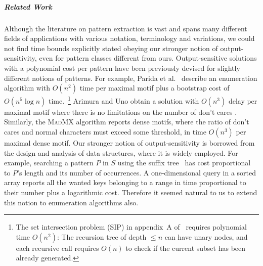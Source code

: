 \subparagraph{Related Work} Although the literature on pattern extraction is vast and spans many different fields of applications with various notation, terminology and variations, we could not find time bounds explicitly stated obeying our stronger notion of output-sensitivity, even for pattern classes different from ours. Output-sensitive solutions with a polynomial cost per pattern have been previously devised for slightly different notions of patterns. For example, Parida et al.~\cite{P+01} describe an enumeration algorithm with $O(n^2)$ time per maximal motif plus a bootstrap cost of $O(n^5 \log n)$ time.~\footnote{The set intersection   problem (SIP) in appendix~A of~\cite{P+01} requires polynomial time   $O(n^2)$: The recursion tree of depth $\leq n$ can have unary nodes,   and each recursive call requires $O(n)$ to check if the current   subset has been already generated.}  Arimura and Uno obtain a solution with $O(n^3)$ delay per maximal motif where there is no limitations on the number of don't cares \cite{arimura2007efficient}. Similarly, the \textsc{MadMX} algorithm \cite{grossi2011madmx} reports dense motifs, where the ratio of don't cares and normal characters must exceed some threshold, in time $O(n^3)$ per maximal dense motif.  Our stronger notion of output-sensitivity is borrowed from the design and analysis of data structures, where it is widely employed. For example, searching a pattern $P$ in $S$ using the suffix tree~\cite{McCreight} has cost proportional to $P$'s length and its number of occurrences. A one-dimensional query in a sorted array reports all the wanted keys belonging to a range in time proportional to their number plus a logarithmic cost. Therefore it seemed natural to us to extend this notion to enumeration algorithms also.

